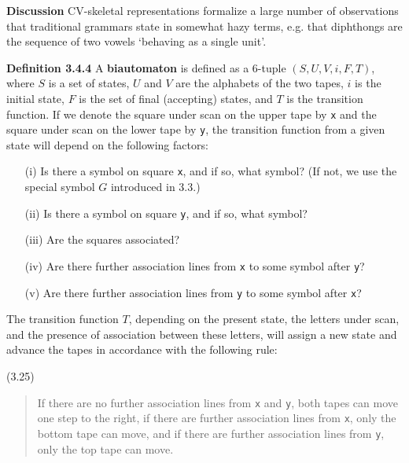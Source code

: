 \smallskip\noindent
{\bf Discussion} CV-skeletal representations formalize a large number of 
observations that traditional grammars state in somewhat hazy terms, e.g. 
that diphthongs are the sequence of two vowels `behaving as a single unit'. 

\smallskip\noindent
{\bf Definition 3.4.4} A {\bf biautomaton} is defined as a 6-tuple $(S, U, V,
i, F, T)$, where $S$ is a set of states, $U$ and $V$ are the alphabets of the
two tapes, $i$ is the initial state, $F$ is the set of final (accepting)
states, and $T$ is the transition function. If we denote the square under scan
on the upper tape by {\tt x} and the square under scan on the lower tape by
{\tt y}, the transition function from a given state will depend on the
following factors: 
\begin{enumerate}
\item[(i)] Is there a symbol on square {\tt x}, and if so, what symbol? (If 
not, we use the special symbol $G$ introduced in 3.3.)
\item[(ii)] Is there a symbol on square {\tt y}, and if so, what symbol?
\item[(iii)] Are the squares associated?
\item[(iv)] Are there further association lines from {\tt x} to
some symbol after {\tt y}?
\item[(v)] Are there further association lines from {\tt y} to
some symbol after {\tt x}?
\end{enumerate}

The transition function $T$, depending on the present state, the letters under
scan, and the presence of association between these letters, will assign a new
state and advance the tapes in accordance with the following rule:

\hfill (3.25)\\
\begin{quote}
If there are no further association lines from {\tt x} and {\tt y}, both tapes
can move one step to the right, if there are further association lines from
{\tt x}, only the bottom tape can move, and if there are further association
lines from {\tt y}, only the top tape can move.
\end{quote}

